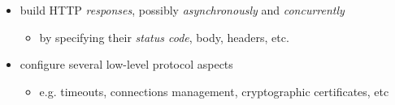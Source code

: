 \documentclass[presentation]{beamer}\mode<presentation>{\usetheme{AMSBolognaFC}}
\begin{document}
\begin{frame}
\begin{itemize}
        \vfill

        \item build HTTP \emph{responses}, possibly \emph{asynchronously} and \emph{concurrently}
        \begin{itemize}
            \item by specifying their \emph{status code}, body, headers, etc.
        \end{itemize}

        \vfill

        \item configure several low-level protocol aspects
        \begin{itemize}
            \item e.g. timeouts, connections management, cryptographic certificates, etc
        \end{itemize}
    \end{itemize}
\end{frame}
\end{document}
